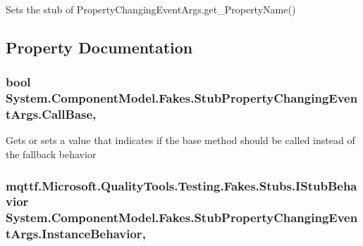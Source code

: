 Sets the stub of Property\-Changing\-Event\-Args.\-get\-\_\-\-Property\-Name()



\subsection{Property Documentation}
\hypertarget{class_system_1_1_component_model_1_1_fakes_1_1_stub_property_changing_event_args_ae9eb5cfdc1bab44b85c8d20707f39973}{
\subsubsection[{Call\-Base}]{\setlength{\rightskip}{0pt plus 5cm}bool System.\-Component\-Model.\-Fakes.\-Stub\-Property\-Changing\-Event\-Args.\-Call\-Base\hspace{0.3cm}{\ttfamily [get]}, {\ttfamily [set]}}}\label{class_system_1_1_component_model_1_1_fakes_1_1_stub_property_changing_event_args_ae9eb5cfdc1bab44b85c8d20707f39973}


Gets or sets a value that indicates if the base method should be called instead of the fallback behavior

\hypertarget{class_system_1_1_component_model_1_1_fakes_1_1_stub_property_changing_event_args_a9a17684f7884ec100571be065843a992}{
\subsubsection[{Instance\-Behavior}]{\setlength{\rightskip}{0pt plus 5cm}mqttf.\-Microsoft.\-Quality\-Tools.\-Testing.\-Fakes.\-Stubs.\-I\-Stub\-Behavior System.\-Component\-Model.\-Fakes.\-Stub\-Property\-Changing\-Event\-Args.\-Instance\-Behavior\hspace{0.3cm}{\ttfamily [get]}, {\ttfamily [set]}}}\label{class_system_1_1_component_model_1_1_fakes_1_1_stub_property_changing_event_args_a9a17684f7884ec100571be065843a992}


